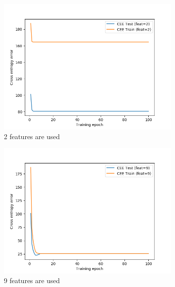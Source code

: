 \documentclass[a4paper,11pt]{article}
\begin{document}
\begin{figure}
	\centering
	\begin{subfigure}[b]{0.49\textwidth}
		\centering
		\includegraphics[width=\textwidth]{images/irls_cee-2.png}
		\caption{2 features are used}
		\label{irls:cee_2}
	\end{subfigure}
	\begin{subfigure}[b]{0.49\textwidth}
		\centering
		\includegraphics[width=\textwidth]{images/irls_cee-9.png}
		\caption{9 features are used}
		\label{irls:cee_9}
	\end{subfigure}
	\begin{subfigure}[b]{0.5\textwidth}
		\centering

\end{subfigure}
\end{figure}
\end{document}
